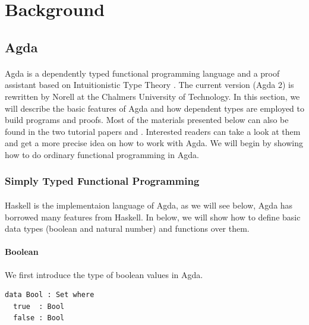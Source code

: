 \documentclass[twoside,openright,final]{bhamthesis}
\begin{document}
\newpage
\section{Background}

\subsection{Agda} 
\paragraph{} Agda is a dependently typed functional programming language and a
proof assistant based on Intuitionistic Type Theory
\cite{martin1984}. The current version (Agda 2) is rewritten by Norell
\cite{norell2007} at the Chalmers University of
Technology. In this section, we will describe the basic features of
Agda and how dependent types are employed to build programs and
proofs. Most of the materials presented below can also be
found in the two tutorial papers \cite{bove2009} and
\cite{norell2009}. Interested readers can take a look at them and get
a more precise idea on how to work with Agda. We will begin by showing how to do ordinary
functional programming in Agda. 

\subsubsection{Simply Typed Functional Programming}
\paragraph{} Haskell is the implementaion language
of Agda, as we will see below, Agda has borrowed many features from
Haskell. In below, we will show how to define basic data types
(boolean and natural number) and functions over them. 

\paragraph{Boolean} We first introduce the type of boolean values in
Agda.  
\begin{lstlisting}[mathescape=true,xleftmargin=.3\textwidth]
data Bool : Set where
  true  : Bool
  false : Bool
\end{lstlisting}
\end{document}
